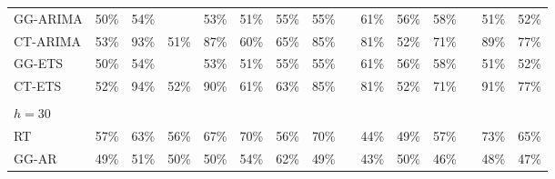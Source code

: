 \documentclass[12pt,a4paper]{article}
\def\textBF#1{\sbox\CBox{#1}\resizebox{\wd\CBox}{\ht\CBox}{\textbf{#1}}}
\begin{document}
\begin{table}[!htbp]
\begin{centering}
\begin{tabular}{@{}lcccccccccccccc@{}}
GG-ARIMA & 50\%                 & 54\%                 & \textBF{55\%}                 & 53\%                 & 51\%                 & 55\%                 & 55\%                 &  & 61\%                 & 56\%                 & 58\%                 &  & 51\%                 & 52\%                  \\
CT-ARIMA & 53\%                 & 93\%                 & 51\%                 & 87\%                 & 60\%                 & 65\%                 & 85\%                 &  & 81\%                 & 52\%                 & 71\%                 &  & 89\%                 & 77\%                  \\
GG-ETS   & 50\%                 & 54\%                 & \textBF{55\%}                 & 53\%                 & 51\%                 & 55\%                 & 55\%                 &  & 61\%                 & 56\%                 & 58\%                 &  & 51\%                 & 52\%                  \\
CT-ETS   & 52\%                 & 94\%                 & 52\%                 & 90\%                 & 61\%                 & 63\%                 & 85\%                 &  & 81\%                 & 52\%                 & 71\%                 &  & 91\%                 & 77\%                  \\
         & \multicolumn{1}{l}{} & \multicolumn{1}{l}{} & \multicolumn{1}{l}{} & \multicolumn{1}{l}{} & \multicolumn{1}{l}{} & \multicolumn{1}{l}{} & \multicolumn{1}{l}{} &  & \multicolumn{1}{l}{} & \multicolumn{1}{l}{} & \multicolumn{1}{l}{} &  & \multicolumn{1}{l}{} & \multicolumn{1}{l}{}  \\
{$h=30$}     & \multicolumn{1}{l}{} & \multicolumn{1}{l}{} & \multicolumn{1}{l}{} & \multicolumn{1}{l}{} & \multicolumn{1}{l}{} & \multicolumn{1}{l}{} & \multicolumn{1}{l}{} &  & \multicolumn{1}{l}{} & \multicolumn{1}{l}{} & \multicolumn{1}{l}{} &  & \multicolumn{1}{l}{} & \multicolumn{1}{l}{}  \\
RT       & 57\%                 & 63\%                 & 56\%                 & 67\%                 & 70\%                 & 56\%                 & 70\%                 &  & 44\%                 & 49\%                 & 57\%                 &  & 73\%                 & 65\%                  \\
GG-AR    & 49\%                 & 51\%                 & 50\%                 & 50\%                 & 54\%                 & 62\%                 & 49\%                 &  & 43\%                 & 50\%                 & 46\%                 &  & 48\%                 & 47\%                  \\

\end{tabular}
\end{centering}
\end{table}
\end{document}

